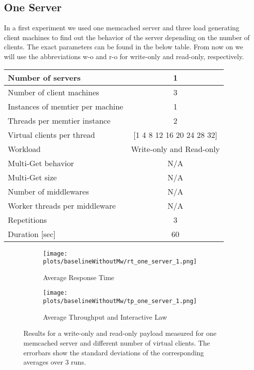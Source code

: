\documentclass[11pt,a4paper]{article}
\begin{document}
\subsection{One Server}

In a first experiment we used one memcached server and three load generating client machines to find out the behavior of the server depending on the number of clients.
The exact parameters can be found in the below table. From now on we will use the abbreviations w-o and r-o for write-only and read-only, respectively.

\begin{center}
	\scriptsize{
		\begin{tabular}{|l|c|}
			\hline Number of servers                & 1                        \\ 
			\hline Number of client machines        & 3                        \\ 
			\hline Instances of memtier per machine & 1                        \\ 
			\hline Threads per memtier instance     & 2                        \\
			\hline Virtual clients per thread       & [1 4 8 12 16 20 24 28 32]                  \\ 
			\hline Workload                         & Write-only and Read-only \\
			\hline Multi-Get behavior               & N/A                      \\
			\hline Multi-Get size                   & N/A                      \\
			\hline Number of middlewares            & N/A                      \\
			\hline Worker threads per middleware    & N/A                      \\
			\hline Repetitions                      & 3              \\ 
			\hline Duration [sec]                   & 60              \\ 
			\hline 
		\end{tabular}
	} 
\end{center}


\begin{figure}
\centering
\begin{subfigure}{.5\textwidth}
    \centering
    \texttt{[image: plots/baselineWithoutMw/rt\_one\_server\_1.png]}
    \caption{Average Response Time }
    \label{plt:bl:rt_one_server_1}
\end{subfigure}%
\begin{subfigure}{.5\textwidth}
    \centering
    \texttt{[image: plots/baselineWithoutMw/tp\_one\_server\_1.png]}
    \caption{Average Throughput and Interactive Law}
    \label{plt:bl:tp_one_server_1}

\end{subfigure}
\caption{Results for a write-only and read-only payload measured for one memcached server and different number of virtual clients. The errorbars show the standard deviations of the corresponding averages over 3 runs.}
\label{plt:bl:one_server_1}
\end{figure}
\end{document}

